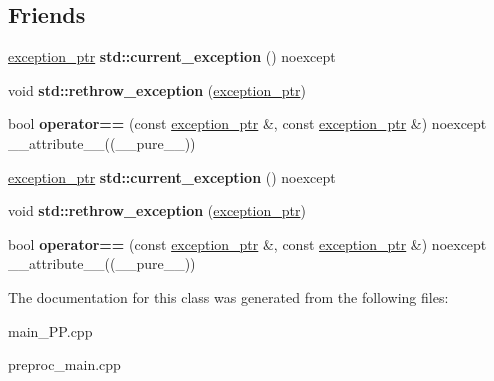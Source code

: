 \subsection*{Friends}
\begin{DoxyCompactItemize}
\item 
\hypertarget{classstd_1_1____exception__ptr_1_1exception__ptr_a81a8b9f9554219ebdb25a8adee1c1473}{\hyperlink{classstd_1_1____exception__ptr_1_1exception__ptr}{exception\+\_\+ptr} {\bfseries std\+::current\+\_\+exception} () noexcept}\label{classstd_1_1____exception__ptr_1_1exception__ptr_a81a8b9f9554219ebdb25a8adee1c1473}

\item 
\hypertarget{classstd_1_1____exception__ptr_1_1exception__ptr_a1cf5c13411faa966fc08c033cbc61c9c}{void {\bfseries std\+::rethrow\+\_\+exception} (\hyperlink{classstd_1_1____exception__ptr_1_1exception__ptr}{exception\+\_\+ptr})}\label{classstd_1_1____exception__ptr_1_1exception__ptr_a1cf5c13411faa966fc08c033cbc61c9c}

\item 
\hypertarget{classstd_1_1____exception__ptr_1_1exception__ptr_a0b164fe5099c68223cafeb335cd35e6c}{bool {\bfseries operator==} (const \hyperlink{classstd_1_1____exception__ptr_1_1exception__ptr}{exception\+\_\+ptr} \&, const \hyperlink{classstd_1_1____exception__ptr_1_1exception__ptr}{exception\+\_\+ptr} \&) noexcept \+\_\+\+\_\+attribute\+\_\+\+\_\+((\+\_\+\+\_\+pure\+\_\+\+\_\+))}\label{classstd_1_1____exception__ptr_1_1exception__ptr_a0b164fe5099c68223cafeb335cd35e6c}

\item 
\hypertarget{classstd_1_1____exception__ptr_1_1exception__ptr_a81a8b9f9554219ebdb25a8adee1c1473}{\hyperlink{classstd_1_1____exception__ptr_1_1exception__ptr}{exception\+\_\+ptr} {\bfseries std\+::current\+\_\+exception} () noexcept}\label{classstd_1_1____exception__ptr_1_1exception__ptr_a81a8b9f9554219ebdb25a8adee1c1473}

\item 
\hypertarget{classstd_1_1____exception__ptr_1_1exception__ptr_a1cf5c13411faa966fc08c033cbc61c9c}{void {\bfseries std\+::rethrow\+\_\+exception} (\hyperlink{classstd_1_1____exception__ptr_1_1exception__ptr}{exception\+\_\+ptr})}\label{classstd_1_1____exception__ptr_1_1exception__ptr_a1cf5c13411faa966fc08c033cbc61c9c}

\item 
\hypertarget{classstd_1_1____exception__ptr_1_1exception__ptr_a0b164fe5099c68223cafeb335cd35e6c}{bool {\bfseries operator==} (const \hyperlink{classstd_1_1____exception__ptr_1_1exception__ptr}{exception\+\_\+ptr} \&, const \hyperlink{classstd_1_1____exception__ptr_1_1exception__ptr}{exception\+\_\+ptr} \&) noexcept \+\_\+\+\_\+attribute\+\_\+\+\_\+((\+\_\+\+\_\+pure\+\_\+\+\_\+))}\label{classstd_1_1____exception__ptr_1_1exception__ptr_a0b164fe5099c68223cafeb335cd35e6c}

\end{DoxyCompactItemize}


The documentation for this class was generated from the following files\+:\begin{DoxyCompactItemize}
\item 
main\+\_\+\+P\+P.\+cpp\item 
preproc\+\_\+main.\+cpp\end{DoxyCompactItemize}
